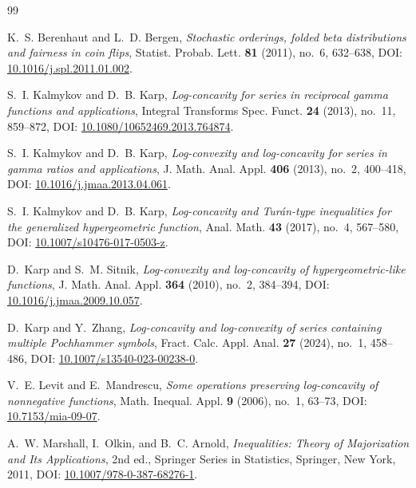 \documentclass[11pt,a4paper]{amsart}
\numberwithin{equation}{section}
\theoremstyle{plain}
\theoremstyle{definition}
\begin{document}
\begin{thebibliography}{99}

K.~S. Berenhaut and L.~D. Bergen,
\emph{Stochastic orderings, folded beta distributions and fairness in coin flips},
Statist. Probab. Lett. \textbf{81} (2011), no.~6, 632--638,
DOI: \href{https://doi.org/10.1016/j.spl.2011.01.002}{10.1016/j.spl.2011.01.002}.

S.~I. Kalmykov and D.~B. Karp,
\emph{Log-concavity for series in reciprocal gamma functions and applications},
Integral Transforms Spec. Funct. \textbf{24} (2013), no.~11, 859--872,
DOI: \href{https://doi.org/10.1080/10652469.2013.764874}{10.1080/10652469.2013.764874}.

S.~I. Kalmykov and D.~B. Karp,
\emph{Log-convexity and log-concavity for series in gamma ratios and applications},
J. Math. Anal. Appl. \textbf{406} (2013), no.~2, 400--418,
DOI: \href{https://doi.org/10.1016/j.jmaa.2013.04.061}{10.1016/j.jmaa.2013.04.061}.

S.~I. Kalmykov and D.~B. Karp,
\emph{Log-concavity and Tur\'an-type inequalities for the generalized hypergeometric function},
Anal. Math. \textbf{43} (2017), no.~4, 567--580,
DOI: \href{https://doi.org/10.1007/s10476-017-0503-z}{10.1007/s10476-017-0503-z}.

D.~Karp and S.~M. Sitnik,
\emph{Log-convexity and log-concavity of hypergeometric-like functions},
J. Math. Anal. Appl. \textbf{364} (2010), no.~2, 384--394,
DOI: \href{https://doi.org/10.1016/j.jmaa.2009.10.057}{10.1016/j.jmaa.2009.10.057}.

D.~Karp and Y.~Zhang,
\emph{Log-concavity and log-convexity of series containing multiple Pochhammer symbols},
Fract. Calc. Appl. Anal. \textbf{27} (2024), no.~1, 458--486,
DOI: \href{https://doi.org/10.1007/s13540-023-00238-0}{10.1007/s13540-023-00238-0}.


V.~E. Levit and E.~Mandrescu,
\emph{Some operations preserving log-concavity of nonnegative functions},
Math. Inequal. Appl. \textbf{9} (2006), no.~1, 63--73,
DOI: \href{https://doi.org/10.7153/mia-09-07}{10.7153/mia-09-07}.

A.~W. Marshall, I.~Olkin, and B.~C. Arnold,
\emph{Inequalities: Theory of Majorization and Its Applications},
2nd ed., Springer Series in Statistics, Springer, New York, 2011,
DOI: \href{https://doi.org/10.1007/978-0-387-68276-1}{10.1007/978-0-387-68276-1}.


\end{thebibliography}
\end{document}
